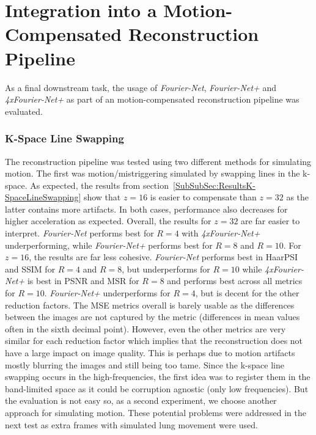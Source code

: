 \section{Integration into a Motion-Compensated Reconstruction Pipeline} \label{Sec:DiscussionIntegrationMotion-CompensatedReconstructionPipeline}
As a final downstream task, the usage of \emph{Fourier-Net}, \emph{Fourier-Net+} and \emph{4xFourier-Net+} as part of an motion-compensated reconstruction pipeline was evaluated.

\subsubsection{K-Space Line Swapping}
The reconstruction pipeline was tested using two different methods for simulating motion. The first was motion/mistriggering simulated by swapping lines in the k-space. As expected, the results from section~\ref{SubSubSec:ResultsK-SpaceLineSwapping} show that $z=16$ is easier to compensate than $z=32$ as the latter contains more artifacts. In both cases, performance also decreases for higher acceleration as expected. Overall, the results for $z=32$ are far easier to interpret. \emph{Fourier-Net} performs best for $R=4$ with \emph{4xFourier-Net+} underperforming, while \emph{Fourier-Net+} performs best for $R=8$ and $R=10$. For $z=16$, the results are far less cohesive. \emph{Fourier-Net} performs best in HaarPSI and SSIM for $R=4$ and $R=8$, but underperforms for $R=10$ while \emph{4xFourier-Net+} is best in PSNR and MSR for $R=8$ and performs best across all metrics for $R=10$. \emph{Fourier-Net+} underperforms for $R=4$, but is decent for the other reduction factors. The MSE metrics overall is barely usable as the differences between the images are not captured by the metric (differences in mean values often in the sixth decimal point). However, even the other metrics are very similar for each reduction factor which implies that the reconstruction does not have a large impact on image quality. This is perhaps due to motion artifacts mostly blurring the images and still being too tame. Since the k-space line swapping occurs in the high-frequencies, the first idea was to register them in the band-limited space as it could be corruption agnostic (only low frequencies). But the evaluation is not easy so, as a second experiment, we choose another approach for simulating motion. These potential problems were addressed in the next test as extra frames with simulated lung movement were used.

